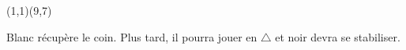 \documentclass[preview, border=0pt, varwidth=false]{standalone}
\begin{document}
	\setgounit{0.6cm} 
	
	\parbox[c][14.65cm][c]{10.2cm}{
			\centering
		\begin{psgopartialboard}{(1,1)(9,7)}
			\pass
		\end{psgopartialboard}
		
		\vspace{1em}
		Blanc récupère le coin. Plus tard, il pourra jouer en $\triangle$ et noir devra se stabiliser.
	}
	
\end{document}
